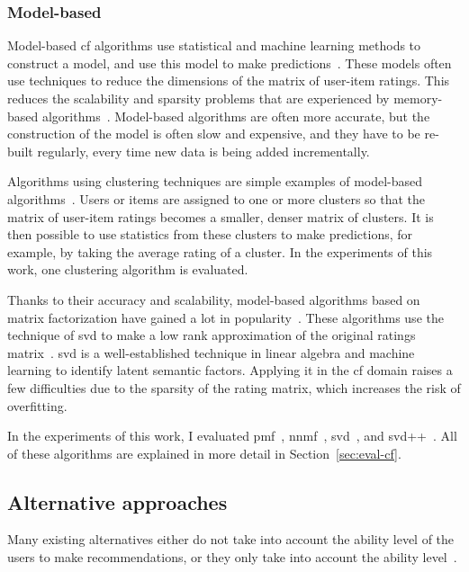 \subsubsection{Model-based}
Model-based \gls{cf} algorithms use statistical and machine learning methods to construct a model, and use this model to make predictions~\cite{sharma2017collaborative, li2021novel,sarwar2002recommender,heckerman2000dependency}.
These models often use techniques to reduce the dimensions of the matrix of user-item ratings.
This reduces the scalability and sparsity problems that are experienced by memory-based algorithms~\cite{sarwar2002recommender,moreno2016web}.
Model-based algorithms are often more accurate, but the construction of the model is often slow and expensive, and they have to be re-built regularly, every time new data is being added incrementally.

Algorithms using clustering techniques are simple examples of model-based algorithms~\cite{su2009survey,breese2013empirical,sarwar2002recommender,o1999clustering}.
Users or items are assigned to one or more clusters so that the matrix of user-item ratings becomes a smaller, denser matrix of clusters.
It is then possible to use statistics from these clusters to make predictions, for example, by taking the average rating of a cluster.
In the experiments of this work, one clustering algorithm is evaluated.

Thanks to their accuracy and scalability, model-based algorithms based on matrix factorization have gained a lot in popularity~\cite{Ricci2010}.
These algorithms use the technique of \gls{svd} to make a low rank approximation of the original ratings matrix~\cite{george2005scalable, Ricci2010, Hug2020}.
\Gls{svd} is a well-established technique in linear algebra and machine learning to identify latent semantic factors.
Applying it in the \gls{cf} domain raises a few difficulties due to the sparsity of the rating matrix, which increases the risk of overfitting.

In the experiments of this work, I evaluated \gls{pmf}~\cite{mnih2008probabilistic}, \gls{nnmf}~\cite{wang2012nonnegative,hoyer2004non}, \gls{svd}~\cite{sarwar2000application,polat2005svd,Ricci2010}, and \gls{svd}++~\cite{koren2008factorization,Ricci2010}.
All of these algorithms are explained in more detail in Section~\ref{sec:eval-cf}.

\subsection{Alternative approaches}
\label{sec:cf-alternatives}
Many existing alternatives either do not take into account the ability level of the users to make recommendations, or they only take into account the ability level~\cite{chen2005personalized}.

